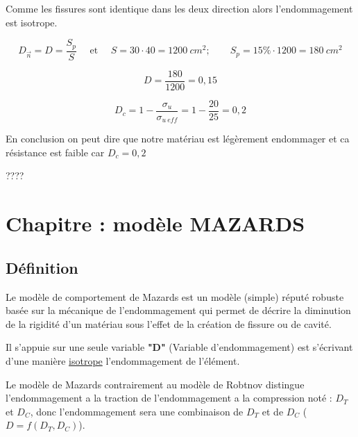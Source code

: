 \documentclass[12pt,a4paper]{report}
\newcommand{\RomanNum}[1] %
{\MakeUppercase{\romannumeral #1}}
\begin{document}
	
	\vspace{\baselineskip}
	
	Comme les fissures sont identique dans les deux direction alors l'endommagement est isotrope.
	
	\[ D_{\vec{n}} = D = \dfrac{S_{p}}{S} \quad \text{ et } \quad S = 30 \cdot 40 = 1200~\unit{cm^{2}} ;\qquad S_{p} = 15\% \cdot 1200 = 180~\unit{cm^{2}}\]
	
	\[ D = \dfrac{180}{1200} = 0,15 \]
	
	\[ D_{c} = 1 - \dfrac{\sigma_{u}}{\sigma_{u \: eff}} = 1 - \dfrac{20}{25} = 0,2 \]
	
	En conclusion on peut dire que notre matériau est légèrement endommager et ca résistance est faible car $D_{c} = 0,2$
	
	{\hspace{0.45\textwidth} \Huge ????}
	
	
	
	
	
	
	
	\newpage
	
	
	
	\chapter{Chapitre \RomanNum{2} : modèle MAZARDS}
	
	
	
	
	\section{Définition}
	
	Le modèle de comportement de Mazards est un modèle (simple) réputé robuste basée sur la mécanique de l'endommagement qui permet de décrire la diminution de la rigidité d'un matériau sous l'effet de la création de fissure ou de cavité.
	
	Il s'appuie sur une seule variable \textbf{"D"} (Variable d'endommagement) est s'écrivant d'une manière \underline{isotrope} l'endommagement de l'élément.
	
	\vspace{\baselineskip}
	
	Le modèle de Mazards contrairement au modèle de Robtnov distingue l'endommagement a la traction de l'endommagement a la compression noté : $D_{T}$ et $D_{C}$, donc l'endommagement sera une combinaison de $D_{T}$ et de $D_{C}$ \big($D = f(D_{T},D_{C})$\big).
	
	\vspace{\baselineskip}
	
\end{document}
